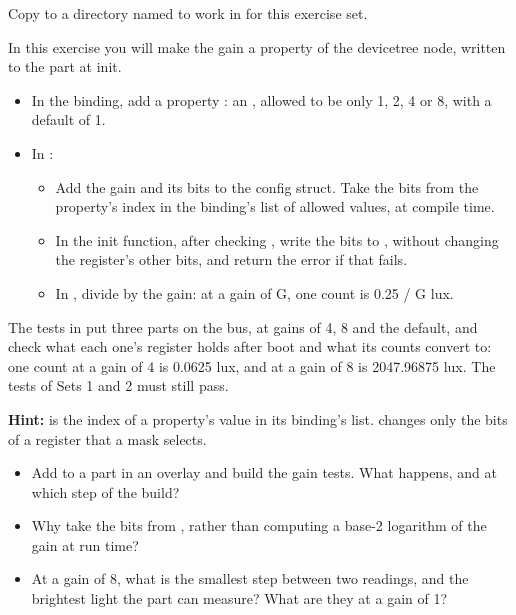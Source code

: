 \label{c5:set:3}
Copy  to a directory named  to work in for this exercise set.

\label{c5:ex:3.1}
In this exercise you will make the gain a property of the devicetree node, written to the part at
init.

\begin{itemize}
  \item In the binding, add a property : an , allowed to be only 1, 2, 4 or 8, with a
    default of 1.
  \item In :
\begin{itemize}
  \item Add the gain and its  bits to the config struct. Take the bits from the property’s index
    in the binding’s list of allowed values, at compile time.
  \item In the init function, after checking , write the  bits to ,
    without changing the register’s other bits, and return the error if that fails.
  \item In , divide by the gain: at a gain of G, one count is 0.25 / G lux.
\end{itemize}
\end{itemize}

The tests in  put three parts on the bus, at gains of 4, 8
and the default, and check what each one’s  register holds after boot and what its
counts convert to: one count at a gain of 4 is 0.0625 lux, and  at a gain of 8 is
2047.96875 lux. The tests of Sets 1 and 2 must still pass.

\textbf{Hint:}  is the index of a property’s value in its
binding’s  list.  changes only the bits of a register that
a mask selects.

\begin{itemize}
  \item Add  to a part in an overlay and build the gain tests. What happens, and at which
    step of the build?
  \item Why take the  bits from , rather than computing a base-2
    logarithm of the gain at run time?
  \item At a gain of 8, what is the smallest step between two readings, and the brightest light the part can
    measure? What are they at a gain of 1?
\end{itemize}

